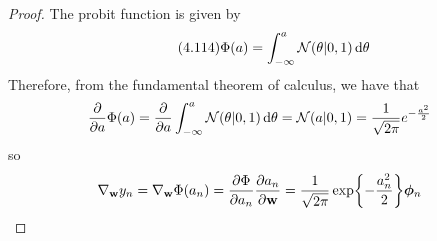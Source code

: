 \vspace{1em}

\begin{proof}
    The probit function is given by 
    \begin{equation}\label{eq:4.114}\tag{4.114}
        \Phi(a) = \int_{-\infty}^{a} \mathcal{N}(\theta | 0, 1) \mathop{}\!\mathrm{d} \theta
    \end{equation}
    Therefore, from the fundamental theorem of calculus, we have that
    \[
        \pdv{a} \Phi(a) 
        = \pdv{a} \int_{-\infty}^a \mathcal{N}(\theta | 0, 1) \mathop{}\!\mathrm{d} \theta
        = \mathcal{N}(a | 0, 1) = \frac{1}{\sqrt{2\pi}} e^{-\frac{a^2}{2}}
    \] 
    so
    \[
        \nabla_\mathbf{w} y_n 
        = \nabla_\mathbf{w} \Phi(a_n)
        = \pdv{\Phi}{a_n} \pdv{a_n}{\mathbf{w}} 
        = \frac{1}{\sqrt{2\pi}} \exp{-\frac{a_n^2}{2}}\bm{\phi}_n
    \]


\end{proof}
